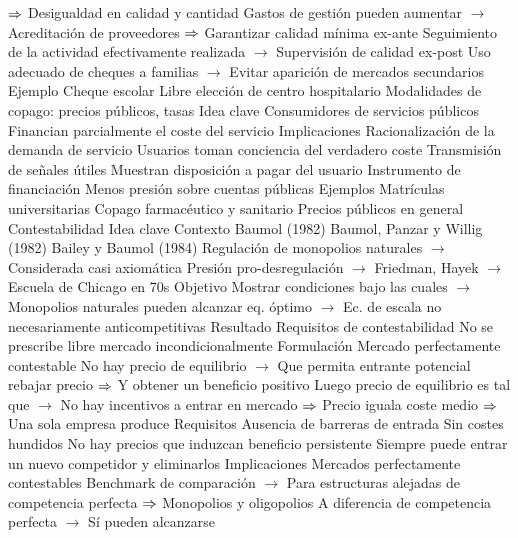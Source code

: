 \documentclass{nuevotema}
\begin{document}
\begin{esquemal}
				\4[] $\then$ Desigualdad en calidad y cantidad
				\4[] Gastos de gestión pueden aumentar
				\4[] $\to$ Acreditación de proveedores
				\4[] $\then$ Garantizar calidad mínima ex-ante
				\4[] Seguimiento de la actividad efectivamente realizada
				\4[] $\to$ Supervisión de calidad ex-post
				\4[] Uso adecuado de cheques a familias
				\4[] $\to$ Evitar aparición de mercados secundarios
				\4 Ejemplo
				\4[] Cheque escolar
				\4[] Libre elección de centro hospitalario
			\3 Modalidades de copago: precios públicos, tasas
				\4 Idea clave
				\4[] Consumidores de servicios públicos
				\4[] Financian parcialmente el coste del servicio
				\4 Implicaciones
				\4[] Racionalización de la demanda de servicio
				\4[] Usuarios toman conciencia del verdadero coste
				\4[] Transmisión de señales útiles
				\4[] Muestran disposición a pagar del usuario
				\4[] Instrumento de financiación
				\4[] Menos presión sobre cuentas públicas
				\4 Ejemplos
				\4[] Matrículas universitarias
				\4[] Copago farmacéutico y sanitario
				\4[] Precios públicos en general
		\2 Contestabilidad
			\3 Idea clave
				\4 Contexto
				\4[] Baumol (1982)
				\4[] Baumol, Panzar y Willig (1982)
				\4[] Bailey y Baumol (1984)
				\4[] Regulación de monopolios naturales
				\4[] $\to$ Considerada casi axiomática
				\4[] Presión pro-desregulación
				\4[] $\to$ Friedman, Hayek
				\4[] $\to$ Escuela de Chicago en 70s
				\4 Objetivo
				\4[] Mostrar condiciones bajo las cuales 
				\4[] $\to$ Monopolios naturales pueden alcanzar eq. óptimo
				\4[] $\to$ Ec. de escala no necesariamente anticompetitivas
				\4 Resultado
				\4[] Requisitos de contestabilidad
				\4[] No se prescribe libre mercado incondicionalmente
			\3 Formulación
				\4 Mercado perfectamente contestable
				\4[] No hay precio de equilibrio
				\4[] $\to$ Que permita entrante potencial rebajar precio
				\4[] $\then$ Y obtener un beneficio positivo
				\4[] Luego precio de equilibrio es tal que
				\4[] $\to$ No hay incentivos a entrar en mercado
				\4[] $\then$ Precio iguala coste medio 
				\4[] $\then$ Una sola empresa produce
				\4 Requisitos
				\4[] Ausencia de barreras de entrada
				\4[] Sin costes hundidos
				\4[$\then$] No hay precios que induzcan beneficio persistente
				\4[] Siempre puede entrar un nuevo competidor y eliminarlos
			\3 Implicaciones
				\4 Mercados perfectamente contestables
				\4[] Benchmark de comparación
				\4[] $\to$ Para estructuras alejadas de competencia perfecta
				\4[] $\then$ Monopolios y oligopolios
				\4[] A diferencia de competencia perfecta
				\4[] $\to$ Sí pueden alcanzarse

\end{esquemal}
\end{document}
